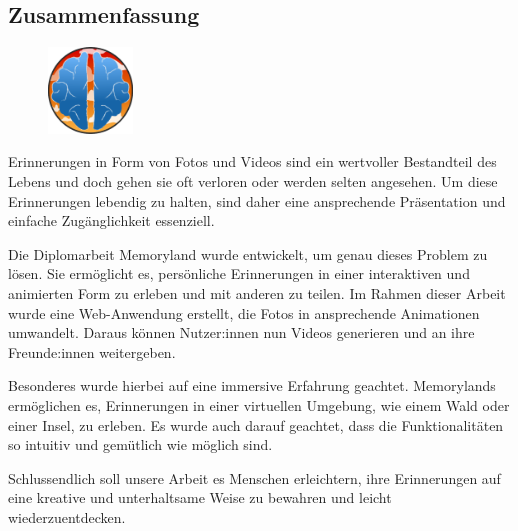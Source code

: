 \newpage
\begin{spacing}{1}
    \chapter*{Zusammenfassung}
\end{spacing}
\begin{figure}
    \begin{center}
      \includegraphics[width=0.2\textwidth]{pics/memoryland-logo.png}
    \end{center}
\end{figure}
Erinnerungen in Form von Fotos und Videos sind ein wertvoller Bestandteil des Lebens und doch
gehen sie oft verloren oder werden selten angesehen. Um diese Erinnerungen lebendig zu halten,
sind daher eine ansprechende Präsentation und einfache Zugänglichkeit essenziell.

Die Diplomarbeit Memoryland wurde entwickelt, um genau dieses Problem zu lösen. Sie ermöglicht es, 
persönliche Erinnerungen in einer interaktiven und animierten Form zu erleben und mit anderen zu 
teilen. Im Rahmen dieser Arbeit wurde eine Web-Anwendung erstellt, die Fotos in ansprechende 
Animationen umwandelt. Daraus können Nutzer:innen nun Videos generieren und an ihre Freunde:innen
weitergeben.

Besonderes wurde hierbei auf eine immersive Erfahrung geachtet. Memorylands ermöglichen es, 
Erinnerungen in einer virtuellen Umgebung, wie einem Wald oder einer Insel, zu erleben. Es
wurde auch darauf geachtet, dass die Funktionalitäten so intuitiv und gemütlich wie möglich
sind.

Schlussendlich soll unsere Arbeit es Menschen erleichtern, ihre Erinnerungen auf eine 
kreative und unterhaltsame Weise zu bewahren und leicht wiederzuentdecken.

